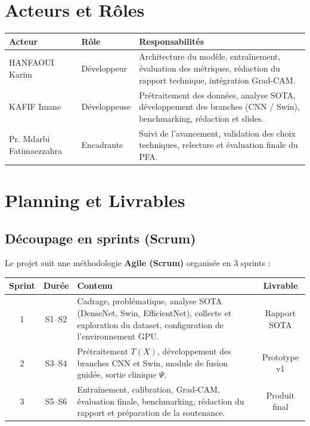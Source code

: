 \documentclass[a4paper,12pt]{article}
\begin{document}
\section{Acteurs et Rôles}

\renewcommand{\arraystretch}{1.5}
\begin{tabularx}{\linewidth}{@{}l l X@{}}
  \toprule
  \textbf{Acteur} & \textbf{Rôle} & \textbf{Responsabilités} \\
  \midrule
  HANFAOUI Karim & Développeur &
    Architecture du modèle, entraînement, évaluation des métriques, rédaction du rapport technique, intégration Grad-CAM. \\
  \rowcolor{grisClair}
  KAFIF Imane & Développeuse &
    Prétraitement des données, analyse SOTA, développement des branches (CNN / Swin), benchmarking, rédaction et slides. \\
  Pr. Mdarbi Fatimaezzahra & Encadrante &
    Suivi de l'avancement, validation des choix techniques, relecture et évaluation finale du PFA. \\
  \bottomrule
\end{tabularx}

\section{Planning et Livrables}

\subsection{Découpage en sprints (Scrum)}

Le projet suit une méthodologie \textbf{Agile (Scrum)} organisée en 3 sprints :

\vspace{0.3cm}

\renewcommand{\arraystretch}{1.4}
\begin{tabularx}{\linewidth}{@{}c c X c@{}}
  \toprule
  \textbf{Sprint} & \textbf{Durée} & \textbf{Contenu} & \textbf{Livrable} \\
  \midrule
  1 & S1–S2 &
    Cadrage, problématique, analyse SOTA (DenseNet, Swin, EfficientNet), collecte et exploration du dataset, configuration de l'environnement GPU. &
    Rapport SOTA \\
  \rowcolor{grisClair}
  2 & S3–S4 &
    Prétraitement $T(X)$, développement des branches CNN et Swin, module de fusion guidée, sortie clinique $\Psi$. &
    Prototype v1 \\
  3 & S5–S6 &
    Entraînement, calibration, Grad-CAM, évaluation finale, benchmarking, rédaction du rapport et préparation de la soutenance. &
    Produit final \\
  \bottomrule
\end{tabularx}
\end{document}
